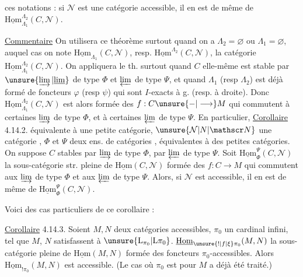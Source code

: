  ces  notations : si $\mathcal N$ est une catégorie accessible, il en est de même de $\underline{\mathrm{Hom}}_{\Lambda_1}^{\Lambda_2}(C,\mathcal N)$.

\uline{Commentaire} On utilisera ce théorème surtout quand on a $\Lambda_2=\varnothing$ ou $\Lambda_1=\varnothing$, auquel cas on note $\underline{\mathrm{Hom}}_{\Lambda_1}(C,\mathcal N)$, resp. $\underline{\mathrm{Hom}}^{\Lambda_2}(C,\mathcal N)$, la catégorie $\underline{\mathrm{Hom}}_{\Lambda_1}^{\Lambda_2}(C,\mathcal N)$.  On appliquera le th. surtout quand $C$ elle-même est stable par $\unsure{\varinjlim|\underline{\lim}}$ de type $\Phi$ et  $\varprojlim$ de type $\Psi$, et quand  $\Lambda_1$ (resp $\Lambda_2$) est déjà formé de foncteurs $\varphi$ (resp $\psi$) qui sont $I$-exacts à g. (resp. à droite). Donc $\underline{\mathrm{Hom}}_{\Lambda_1}^{\Lambda_2}(C,\mathcal N)$ est alors formée des $f:C\unsure{-|\longrightarrow}M$ qui commutent à certaines $\varinjlim$ de type $\Phi$, et à certaines $\varprojlim$ de type $\Psi$. En particulier, 
\uline{Corollaire} 4.14.2.   équivalente à une petite catégorie, $\unsure{\mathcal N|N|\mathscr N}$ une catégorie , $\Phi$ et $\Psi$ deux  ens. de catégories , équivalentes à des petites catégories. On suppose  $C$  stables par $\varinjlim$ de type $\Phi$, par $\varprojlim$ de type $\Psi$. Soit $\underline{\mathrm{Hom}}_{\Phi}^{\Psi}(C,\mathcal N)$ la sous-catégorie str. pleine de $\underline{\mathrm{Hom}}(C,\mathcal N)$ formée des $f:C\longrightarrow M$ qui commutent aux $\varinjlim$ de type $\Phi$ et aux $\varprojlim$ de type $\Psi$. Alors, si $\mathcal N$ est accessible, il en est de même de $\underline{\mathrm{Hom}}_{\Phi}^{\Psi}(C,\mathcal N)$.

Voici des cas particuliers  de ce corollaire :

\uline{Corollaire} 4.14.3. Soient $M,N$ deux catégories accessibles,  $\pi_0$ un cardinal infini, tel que $M$,  $N$ satisfassent à $\unsure{\mathrm L_{\pi_0}|\mathrm L\pi_0}$.  $\underline{\mathrm{Hom}}_{\unsure{!|f|\xi}\pi_0}(M,N)$ la sous-catégorie  pleine de $\underline{\mathrm{Hom}}(M,N)$ formée des foncteurs $\pi_0$-accessibles. Alors $\underline{\mathrm{Hom}}_{!\pi_0}(M,N)$ est accessible.
(Le cas où $\pi_0$ est  pour $M$ a déjà été traité.)

